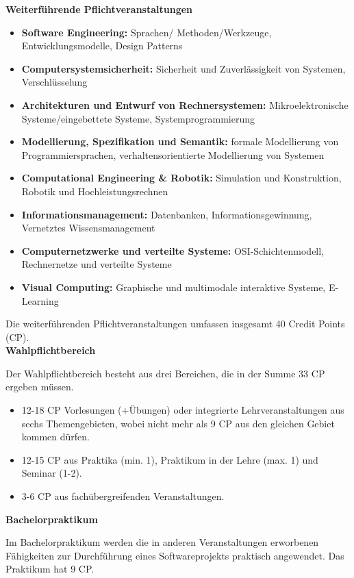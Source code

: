 {    \noindent\textbf{Weiterführende Pflichtveranstaltungen}
    \begin{itemize}
        \item \textbf{Software Engineering:} Sprachen/ Methoden/Werkzeuge, Entwicklungsmodelle, Design Patterns
        \item \textbf{Computersystemsicherheit:} Sicherheit und Zuverlässigkeit von Systemen, Verschlüsselung
        \item \textbf{Architekturen und Entwurf von Rechnersystemen:} Mikroelektronische Systeme/eingebettete Systeme, Systemprogrammierung
        \item \textbf{Modellierung, Spezifikation und Semantik:} formale Modellierung von Programmiersprachen, verhaltensorientierte Modellierung von Systemen
        \item \textbf{Computational Engineering \& Robotik:} Simulation und Konstruktion, Robotik und Hochleistungsrechnen
        \item \textbf{Informationsmanagement:} Datenbanken, Informationsgewinnung, Vernetztes Wissensmanagement
        \item \textbf{Computernetzwerke und verteilte Systeme:} OSI-Schichtenmodell, Rechnernetze und verteilte Systeme
        \item \textbf{Visual Computing:} Graphische und multimodale interaktive Systeme, E-Learning
    \end{itemize}

    Die weiterführenden Pflichtveranstaltungen umfassen insgesamt 40 Credit Points (CP).\\
    \clearpage
    \noindent\textbf{Wahlpflichtbereich}

    Der Wahlpflichtbereich besteht aus drei Bereichen, die in der Summe 33 CP ergeben müssen.
    \begin{itemize}
        \item 12-18 CP Vorlesungen (+Übungen) oder integrierte Lehrveranstaltungen aus sechs Themengebieten, wobei nicht mehr als 9 CP aus den gleichen Gebiet kommen dürfen.
        \item 12-15 CP aus Praktika (min. 1), Praktikum in der Lehre (max. 1) und Seminar (1-2).
        \item 3-6 CP aus fachübergreifenden Veranstaltungen.
    \end{itemize}


    \noindent\textbf{Bachelorpraktikum}

    Im Bachelorpraktikum werden die in anderen Veranstaltungen erworbenen Fähigkeiten zur Durchführung eines Softwareprojekts praktisch angewendet. Das Praktikum hat 9 CP.\\

}
